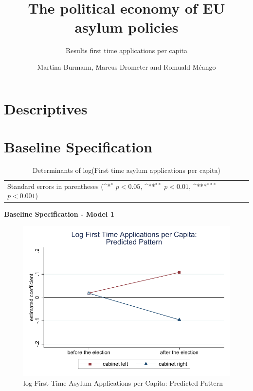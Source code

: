 \documentclass[10pt,a4paper]{scrartcl}
\begin{document}
	\title{The political economy of EU asylum policies}
	\subtitle{Results first time applications per capita}
	\author{Martina Burmann, Marcus Drometer and Romuald Méango}
	\maketitle


\tableofcontents

\clearpage
\FloatBarrier
\section{Descriptives}

 
 
 
 
 
 
\clearpage
\FloatBarrier
\section{Baseline Specification}
\begin{table}[!ht]\centering
\renewcommand{\arraystretch}{1.25}
\small
\def\sym#1{\ifmmode^{#1}\else\(^{#1}\)\fi}
\caption{Determinants of log(First time asylum applications per capita)}
\begin{tabular}{l*{3}{c}}
	\hline\hline
	
	\hline\hline
	\multicolumn{4}{l}{\footnotesize Standard errors in parentheses (\sym{*} \(p<0.05\), \sym{**} \(p<0.01\), \sym{***} \(p<0.001\))}\\
\end{tabular}
\end{table}

\clearpage
\textbf{Baseline Specification - Model 1}
\begin{figure}[!ht]
	\centering
	\includegraphics[width=1\textwidth]{figures_edited/app_graph1_baseline.pdf}
	\caption{log First Time Asylum Applications per Capita: Predicted Pattern}
\end{figure}
\end{document}
